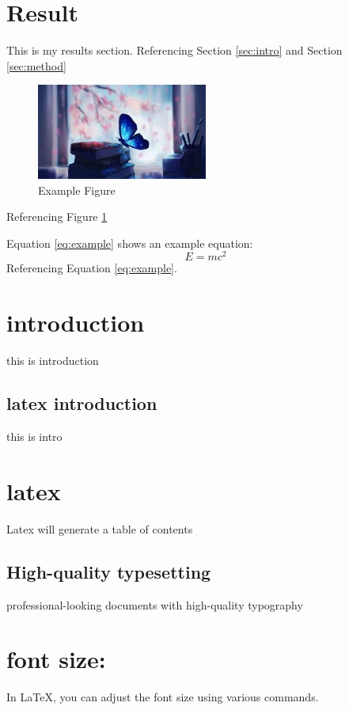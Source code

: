 \documentclass{article}
\begin{document}
    \section{Result}\label{sec:results}
    This is my results section. Referencing Section \ref{sec:intro} and Section
    \ref{sec:method}
    
    \begin{figure}[htbp]
    	\centering
    	\includegraphics[width=0.5\textwidth]{click.jpg}
    	\caption{Example Figure}\label{fig: example}
    
    \end{figure}
    Referencing Figure \ref{fig: example}
    
    Equation \ref{eq:example} shows an example equation:
    \begin {equation}\label{eq:example}
    E = mc^2
    \end{equation}
    Referencing Equation \ref{eq:example}.
    
   
    \tableofcontents
    \newpage
    \section{introduction}    
    this is introduction
    \subsection{latex introduction}
    this is intro
    \section{latex}
    
    Latex will generate a table of contents
    \subsection{High-quality typesetting}
    professional-looking documents with high-quality typography
    \section{font size:}
    In LaTeX, you can adjust the font size using various commands.
\end{document}
